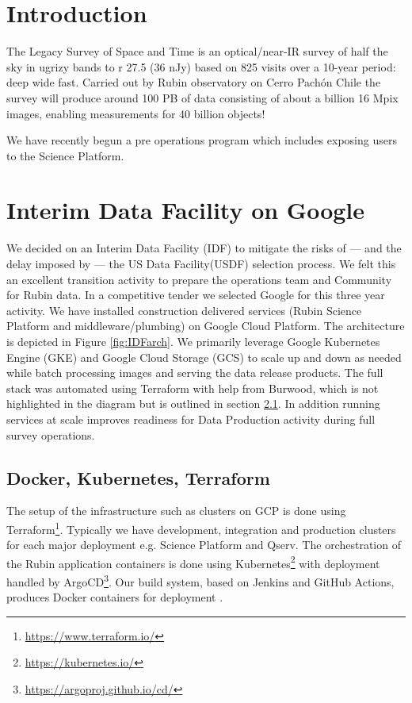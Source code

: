 
\section{Introduction}

The Legacy Survey of Space and Time is an optical/near-IR survey of half the sky in ugrizy bands to r 27.5 (36 nJy) based on 825 visits over a 10-year period: deep wide fast.
Carried out by Rubin observatory on Cerro Pach\'{o}n Chile the survey will produce around 100 PB of data consisting of about a billion 16 Mpix images, enabling measurements for 40 billion objects! \cite{arXiv:0805.2366}

We have recently begun a pre operations program which includes exposing users to the Science Platform.


\section{Interim Data Facility on Google }
We decided on an Interim Data Facility (IDF) to mitigate the risks of — and the delay imposed by — the US Data Facility(USDF)  selection process.
We felt this an excellent transition activity to prepare the operations  team and Community for Rubin data.
In a competitive tender we selected Google for this three year activity.
We have installed construction delivered services (Rubin Science Platform and middleware/plumbing) on Google Cloud Platform.
The architecture is depicted in Figure \ref{fig:IDFarch}.
We primarily leverage Google Kubernetes Engine (GKE) and Google Cloud Storage (GCS) to scale up and down as needed while batch processing images  and serving the data release products.
The full stack was automated using Terraform with help from Burwood, which is not highlighted in the diagram but is outlined in section \ref{sec:infra}.
In addition running services at scale improves readiness for Data Production activity during full survey operations.







\subsection{ Docker, Kubernetes, Terraform} \label{sec:infra}
The setup of the infrastructure such as clusters on GCP is done using Terraform\footnote{\url{https://www.terraform.io/}}.
Typically we have development, integration and production clusters for each major deployment e.g. Science Platform and Qserv.
The orchestration of the Rubin application containers is done using Kubernetes\footnote{\url{https://kubernetes.io/}} with deployment handled by ArgoCD\footnote{\url{https://argoproj.github.io/cd/}}.
Our build system, based on Jenkins and GitHub Actions,  produces Docker containers for deployment \citep{2018SPIE10707E..09J}.

